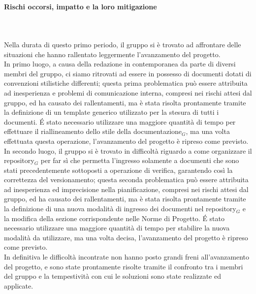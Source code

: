 \paragraph{Rischi occorsi, impatto e la loro mitigazione} \hspace{1cm} 
\\ \hspace{1cm} \\
Nella durata di questo primo periodo, il gruppo si è trovato ad affrontare delle situazioni che hanno rallentato leggermente l'avanzamento del progetto.\\
In primo luogo, a causa della redazione in contemporanea da parte di diversi membri del gruppo, ci siamo ritrovati ad essere in possesso di documenti dotati di convenzioni stilistiche differenti; questa prima problematica può essere attribuita ad inesperienza e problemi di comunicazione interna, compresi nei rischi attesi dal gruppo, ed ha causato dei rallentamenti, ma è stata risolta prontamente tramite la definizione di un template generico utilizzato per la stesura di tutti i documenti. \'E stato necessario utilizzare una maggiore quantità di tempo per effettuare il riallineamento dello stile della documentazione$_G$, ma una volta effettuata questa operazione, l'avanzamento del progetto è ripreso come previsto.\\
In secondo luogo, il gruppo si è trovato in difficoltà riguardo a come organizzare il repository$_G$ per far sì che permetta l'ingresso solamente a documenti che sono stati precedentemente sottoposti a operazione di verifica, garantendo così la correttezza del versionamento; questa seconda problematica può essere attribuita ad inesperienza ed imprecisione nella pianificazione, compresi nei rischi attesi dal gruppo, ed ha causato dei rallentamenti, ma è stata risolta prontamente tramite la definizione di una nuova modalità di ingresso dei documenti nel repository$_G$ e la modifica della sezione corrispondente nelle Norme di Progetto. \'E stato necessario utilizzare una maggiore quantità di tempo per stabilire la nuova modalità da utilizzare, ma una volta decisa, l'avanzamento del progetto è ripreso come previsto.\\
In definitiva le difficoltà incontrate non hanno posto grandi freni all'avanzamento del progetto, e sono state prontamente risolte tramite il confronto tra i membri del gruppo e la tempestività con cui le soluzioni sono state realizzate ed applicate.

